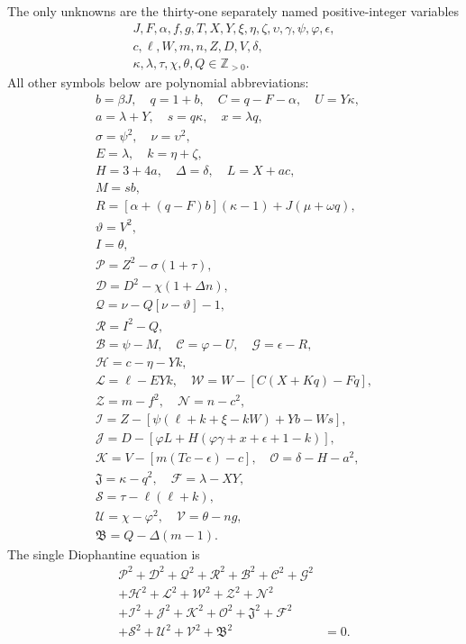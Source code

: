 The only unknowns are the thirty-one separately named positive-integer variables
\[
\begin{gathered}J,F,\alpha,f,g,T,X,Y,\xi,\eta,\zeta,\upsilon,\gamma,\psi,\varphi,\epsilon,\\
c,\ell,W,m,n,Z,D,V,\delta,\\
\kappa,\lambda,\tau,\chi,\theta,Q\in\mathbb Z_{>0}.\end{gathered}
\]
All other symbols below are polynomial abbreviations:
\[
\begin{gathered}
b=\beta J,\quad q=1+b,\quad C=q-F-\alpha,\quad U=Y\kappa,\\
a=\lambda+Y,\quad s=q\kappa,\quad x=\lambda q,\\
\sigma=\psi^2,\quad\nu=\upsilon^2,\\
E=\lambda,\quad k=\eta+\zeta,\\
H=3+4a,\quad\Delta=\delta,\quad L=X+ac,\\
M=sb,\\
R=[\alpha+(q-F)b](\kappa-1)+J(\mu+\omega q),\\
\vartheta=V^2,\\
I=\theta,\\
\mathcal{P}=Z^2-\sigma(1+\tau),\\
\mathcal{D}=D^2-\chi(1+\Delta n),\\
\mathcal{Q}=\nu-Q[\nu-\vartheta]-1,\\
\mathcal{R}=I^2-Q,\\
\mathcal{B}=\psi-M,\quad \mathcal{C}=\varphi-U,\quad \mathcal{G}=\epsilon-R,\\
\mathcal{H}=c-\eta-Yk,\\
\mathcal{L}=\ell-EYk,\quad \mathcal{W}=W-[C(X+Kq)-Fq],\\
\mathcal{Z}=m-f^2,\quad \mathcal{N}=n-c^2,\\
\mathcal{I}=Z-[\psi(\ell+k+\xi-kW)+Yb-Ws],\\
\mathcal{J}=D-[\varphi L+H(\varphi\gamma+x+\epsilon+1-k)],\\
\mathcal{K}=V-[m(Tc-\epsilon)-c],\quad\mathcal{O}=\delta-H-a^2,\\
\mathfrak{J}=\kappa-q^2,\quad\mathcal{F}=\lambda-XY,\\
\mathcal{S}=\tau-\ell(\ell+k),\\
\mathcal{U}=\chi-\varphi^2,\quad\mathcal{V}=\theta-ng,\\
\mathfrak{B}=Q-\Delta(m-1).
\end{gathered}
\]
The single Diophantine equation is
\[
\begin{split}
\mathcal{P}^2+\mathcal{D}^2+\mathcal{Q}^2+\mathcal{R}^2+\mathcal{B}^2+\mathcal{C}^2+\mathcal{G}^2 &\\
+\mathcal{H}^2+\mathcal{L}^2+\mathcal{W}^2+\mathcal{Z}^2+\mathcal{N}^2 &\\
+\mathcal{I}^2+\mathcal{J}^2+\mathcal{K}^2+\mathcal{O}^2+\mathfrak{J}^2+\mathcal{F}^2 &\\
+\mathcal{S}^2+\mathcal{U}^2+\mathcal{V}^2+\mathfrak{B}^2 &= 0.
\end{split}
\]

